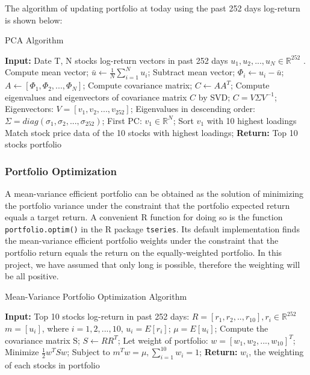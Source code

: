 \documentclass[11pt,a4paper]{article}
\begin{document}
    \noindent
    The algorithm of updating portfolio at today using the past 252 days log-return is shown below:
    \begin{algorithm}[H]
    \caption{PCA Algorithm}
    \begin{algorithmic}[1]
    \State \textbf{Input:} Date T, N stocks log-return vectors in past 252 days $u_{1},u_{2}, ... ,u_{N} \in \mathbb{R}^{252}$ .
    \State Compute mean vector;
    \State $\bar{u} \gets \frac{1}{N} \sum_{i=1}^{N}u_{i}$;
    \State Subtract mean vector;
        \State $\Phi_{i} \gets u_{i} - \bar{u}$;
    \EndFor
    \State $A \gets [\Phi_{1}, \Phi_{2}, ..., \Phi_{N}]$;
    \State Compute covariance matrix;
    \State $C \gets  AA^{T}$;
    \State Compute eigenvalues and eigenvectors of covariance matrix $C$ by SVD;
    \State $C = V \Sigma V^{-1}$;
    \State Eigenvectors:
    \State $V = [v_{1}, v_{2}, ..., v_{252}]$;
    \State Eigenvalues in descending order:
    \State $\Sigma = diag(\sigma_{1}, \sigma_{2}, ..., \sigma_{252})$;
    \State First PC: $v_{1} \in \mathbb{R}^{N}$;
    \State Sort $v_{1}$ with 10 highest loadings
    \State Match stock price data of the 10 stocks with highest loadings;
    \State \textbf{Return:} Top 10 stocks portfolio
    \end{algorithmic}
    \end{algorithm}
    
    
    \subsubsection{Portfolio Optimization}
    A mean-variance efficient portfolio can be obtained as the solution of minimizing the portfolio variance under the constraint that the portfolio expected return equals a target return. A convenient R function for doing so is the function \texttt{portfolio.optim()} in the R package \texttt{tseries}. Its default implementation finds the mean-variance efficient portfolio weights under the constraint that the portfolio return equals the return on the equally-weighted portfolio. In this project, we have assumed that only long is possible, therefore the weighting will be all positive.
    
    \begin{algorithm}[H]
    \caption{Mean-Variance Portfolio Optimization Algorithm}
    \begin{algorithmic}[1]
    \State \textbf{Input:} Top 10 stocks log-return in past 252 days: $R = [r_{1}, r_{2}, .., r_{10}], r_{i} \in \mathbb{R}^{252}$
    \State $m = [u_{i}]$, where $i = 1,2, ..., 10$, $u_{i}=E[r_{i}]$;
    \State $\mu = E[u_{i}]$;
    \State Compute the covariance matrix S;
    \State $S \gets RR^{T}$;
    \State Let weight of portfolio: $w = [w_{1},w_{2}, ...,w_{10}]^{T}$;
    \State Minimize $\frac{1}{2}w^{T}Sw$; Subject to $m^{T}w = \mu, \sum_{i=1}^{10}w_{i} = 1$;
    \State \textbf{Return:} $w_{i}$, the weighting of each stocks in portfolio
    \end{algorithmic}
    \end{algorithm}
    
\end{document}
